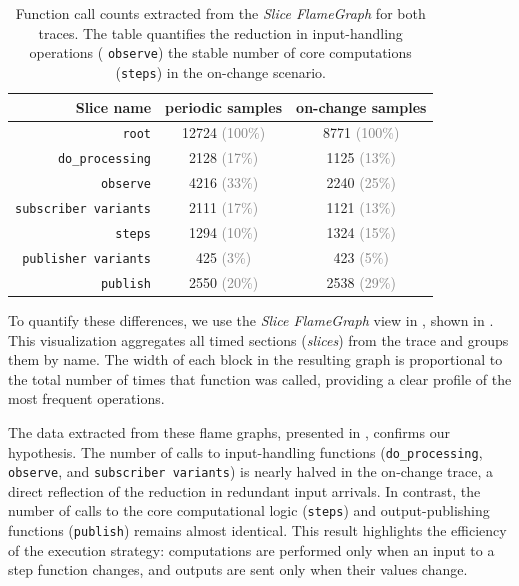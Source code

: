\begin{table}[H]
    \centering
    \begin{tabular}{|r|cc|}
        \hline
        Slice name                   & periodic samples                & on-change samples              \\\hline
        \texttt{root}                & 12724 \textcolor{gray}{(100\%)} & 8771 \textcolor{gray}{(100\%)} \\
        \texttt{do\_processing}      & 2128 \textcolor{gray}{(17\%)}   & 1125 \textcolor{gray}{(13\%)}  \\
        \texttt{observe}             & 4216 \textcolor{gray}{(33\%)}   & 2240 \textcolor{gray}{(25\%)}  \\
        \texttt{subscriber variants} & 2111 \textcolor{gray}{(17\%)}   & 1121 \textcolor{gray}{(13\%)}  \\
        \texttt{steps}               & 1294 \textcolor{gray}{(10\%)}   & 1324 \textcolor{gray}{(15\%)}  \\
        \texttt{publisher variants}  & 425 \textcolor{gray}{(3\%)}     & 423 \textcolor{gray}{(5\%)}    \\
        \texttt{publish}             & 2550 \textcolor{gray}{(20\%)}   & 2538 \textcolor{gray}{(29\%)}  \\\hline
    \end{tabular}
    \caption[Function call counts, from the \perfetto \emph{Slice FlameGraph}.]%
    {Function call counts extracted from the \perfetto \emph{Slice FlameGraph} for both
        traces. The table quantifies the reduction in input-handling operations (\eg
        \texttt{observe}) \versus the stable number of core computations (\texttt{steps}) in the
        on-change scenario.}
    \label{tab:grust:benchmarks:grust_vs_rust:perfetto:samples}
\end{table}

To quantify these differences, we use the \emph{Slice FlameGraph} view in \perfetto, shown in
. This visualization aggregates all timed
sections (\textit{slices}) from the trace and groups them by name. The width of each block in the
resulting graph is proportional to the total number of times that function was called, providing a
clear profile of the most frequent operations.

The data extracted from these flame graphs, presented in
, confirms our hypothesis. The number of
calls to input-handling functions (\texttt{do\_processing}, \texttt{observe}, and \texttt{subscriber
    variants}) is nearly halved in the on-change trace, a direct reflection of the reduction in
redundant input arrivals. In contrast, the number of calls to the core computational logic
(\texttt{steps}) and output-publishing functions (\texttt{publish}) remains almost identical. This
result highlights the efficiency of the \GRust execution strategy: computations are performed only
when an input to a step function changes, and outputs are sent only when their values change.

